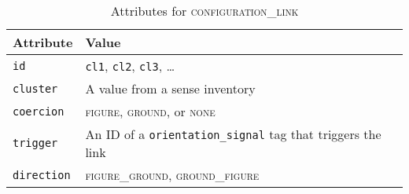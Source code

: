 \documentclass[11pt]{article}
\newenvironment{attributes}
{
\begin{tabular}{|l|l|}
    \hline \textbf{Attribute} & \textbf{Value}\\
}
{   \hline
\end{tabular}
}
\begin{document}
\begin{table}[h]
\centering
\begin{attributes}
    \hline \texttt{id}                  & \texttt{cl1}, \texttt{cl2}, 
                                          \texttt{cl3}, \ldots\\
    \hline \texttt{cluster}             & A value from a sense inventory\\
    \hline \texttt{coercion}            & \textsc{figure}, \textsc{ground}, or \textsc{none}\\
    \hline \texttt{trigger}             & An ID of a \texttt{orientation\_signal} tag that triggers the link\\
    \hline \texttt{direction}           & \textsc{figure\_ground}, \textsc{ground\_figure}\\
\end{attributes}
\caption{Attributes for \textsc{configuration\_link}}
\label{tab:configuration_link}
\end{table}




\end{document}
